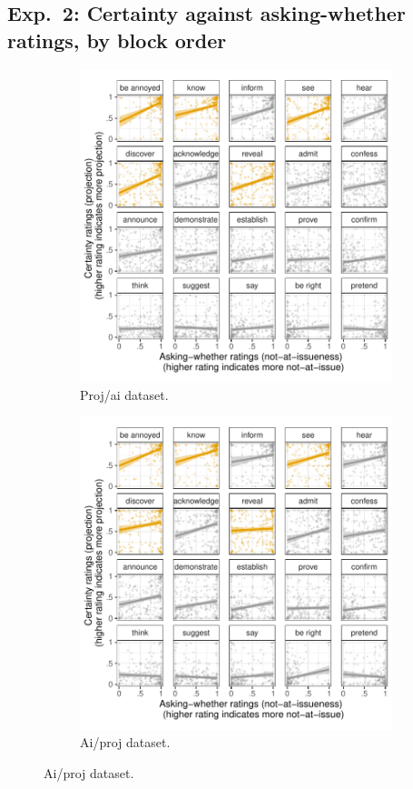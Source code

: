 \documentclass[11pt,fleqn]{article}
\newcommand{\6}{\mbox{$[\hspace*{-.6mm}[$}}
\newcommand{\9}{\mbox{$]\hspace*{-.6mm}]$}}
\begin{document}
\newpage

\subsection{Exp.~2: Certainty against asking-whether ratings, by block order}

\begin{figure}[h!]
\centering
\begin{subfigure}[t]{0.49\textwidth}
\centering
\includegraphics[width=.9\textwidth]{../../results/exp2/graphs/SUP-projai-projection-by-ai}
\caption{Proj/ai dataset.}
\end{subfigure} \hfill \begin{subfigure}[t]{0.49\textwidth}
\centering
\includegraphics[width=.9\textwidth]{../../results/exp2/graphs/SUP-aiproj-projection-by-ai}
\caption{Ai/proj dataset.}
 \end{subfigure}
 

\end{figure}
\end{document}
